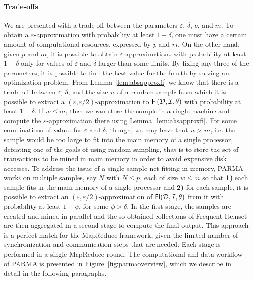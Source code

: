 \paragraph*{Trade-offs} We are presented with a trade-off between the parameters
$\varepsilon$, $\delta$, $p$, and $m$. To obtain a $\varepsilon$-approximation
with probability at least $1-\delta$, one must have a certain amount of computational resources,
expressed by $p$ and $m$. On the other hand, given $p$ and $m$, it is possible
to obtain $\varepsilon$-approximations with probability at least
$1-\delta$ only for values of $\varepsilon$ and $\delta$ larger than some
limits. By fixing any three of the parameters, it is possible to find the
best value for the fourth by solving an optimization problem. From
Lemma~\ref{lem:absapproxfi} we know that there is a trade-off between
$\varepsilon$, $\delta$, and the size $w$ of a random sample from which it is
possible to extract a $(\varepsilon,\varepsilon/2)$-approximation to
$\mathsf{FI}({\cal D},{\cal I},\theta)$ with probability at least $1-\delta$. If $w\le m$, then
we can store the sample in a single machine and compute the
$\varepsilon$-approximation there using Lemma~\ref{lem:absapproxfi}. For some
combinations of values for $\varepsilon$ and $\delta$, though, we may have that
$w>m$, i.e. the sample would be too large to fit into the main memory of a single
processor, defeating one of the goals of using random sampling, that is to store
the set of transactions to be mined in main memory in order to avoid expensive disk
accesses. To address the issue of a single sample not fitting in memory, PARMA
works on multiple samples, say $N$ with $N\le p$, each of size $w\le m$ so that
{\bf 1)} each sample fits in the main memory of a single processor and {\bf 2)}
for each sample, it is possible to extract an
$(\varepsilon,\varepsilon/2)$-approximation of $\mathsf{FI}({\cal D},{\cal I},\theta)$ from it
with probability at least $1-\phi$, for some $\phi>\delta$. In the first stage,
the samples are created and mined in parallel and the so-obtained collections of
Frequent Itemset are then aggregated in a second stage to compute the final output. This
approach is a perfect match for the MapReduce framework, given the limited
number of synchronization and
communication steps that are needed. Each
stage is performed in a single MapReduce round. The computational and data
workflow of PARMA is presented in Figure~\ref{fig:parmaoverview}, which we
describe in detail in the following paragraphs.

